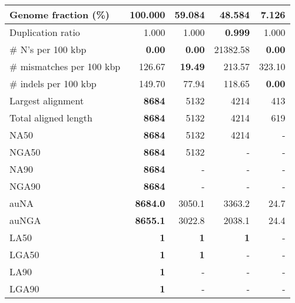\documentclass[12pt,a4paper]{article}
\begin{document}
\begin{table}[ht]
\begin{center}
\begin{tabular}{|l*{4}{|r}|}
Genome fraction (\%) & {\bf 100.000} & 59.084 & 48.584 & 7.126 \\ \hline
Duplication ratio & 1.000 & 1.000 & {\bf 0.999} & 1.000 \\ \hline
\# N's per 100 kbp & {\bf 0.00} & {\bf 0.00} & 21382.58 & {\bf 0.00} \\ \hline
\# mismatches per 100 kbp & 126.67 & {\bf 19.49} & 213.57 & 323.10 \\ \hline
\# indels per 100 kbp & 149.70 & 77.94 & 118.65 & {\bf 0.00} \\ \hline
Largest alignment & {\bf 8684} & 5132 & 4214 & 413 \\ \hline
Total aligned length & {\bf 8684} & 5132 & 4214 & 619 \\ \hline
NA50 & {\bf 8684} & 5132 & 4214 & - \\ \hline
NGA50 & {\bf 8684} & 5132 & - & - \\ \hline
NA90 & {\bf 8684} & - & - & - \\ \hline
NGA90 & {\bf 8684} & - & - & - \\ \hline
auNA & {\bf 8684.0} & 3050.1 & 3363.2 & 24.7 \\ \hline
auNGA & {\bf 8655.1} & 3022.8 & 2038.1 & 24.4 \\ \hline
LA50 & {\bf 1} & {\bf 1} & {\bf 1} & - \\ \hline
LGA50 & {\bf 1} & {\bf 1} & - & - \\ \hline
LA90 & {\bf 1} & - & - & - \\ \hline
LGA90 & {\bf 1} & - & - & - \\ \hline
\end{tabular}
\end{center}
\end{table}
\end{document}
